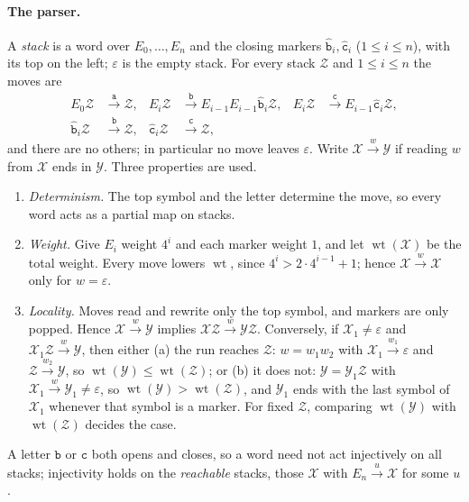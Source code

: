 \documentclass[11pt]{article}
\numberwithin{equation}{section}
\theoremstyle{plain}
\theoremstyle{definition}
\theoremstyle{remark}
\newcommand{\eps}{\varepsilon}
\theoremstyle{plain}
\begin{document}
\paragraph{The parser.}
A \emph{stack} is a word over $E_0,\ldots,E_n$ and the closing markers
$\hat{\mathtt b}_i,\hat{\mathtt c}_i$ ($1\le i\le n$), with its top on the left; $\eps$
is the empty stack.  For every stack $\mathcal Z$ and $1\le i\le n$ the moves are
\[
\begin{aligned}
E_0\mathcal Z&\xrightarrow{\mathtt a}\mathcal Z,&
E_i\mathcal Z&\xrightarrow{\mathtt b}E_{i-1}E_{i-1}\hat{\mathtt b}_i\mathcal Z,&
E_i\mathcal Z&\xrightarrow{\mathtt c}E_{i-1}\hat{\mathtt c}_i\mathcal Z,\\
\hat{\mathtt b}_i\mathcal Z&\xrightarrow{\mathtt b}\mathcal Z,&
\hat{\mathtt c}_i\mathcal Z&\xrightarrow{\mathtt c}\mathcal Z,
\end{aligned}
\]
and there are no others; in particular no move leaves $\eps$.  Write
$\mathcal X\xrightarrow{w}\mathcal Y$ if reading $w$ from $\mathcal X$ ends in
$\mathcal Y$.  Three properties are used.
\begin{enumerate}[label=\textup{(D\arabic*)},leftmargin=2.6em]
\item \emph{Determinism.} The top symbol and the letter determine the move, so
every word acts as a partial map on stacks.
\item \emph{Weight.} Give $E_i$ weight $4^i$ and each marker weight $1$, and let
$\operatorname{wt}(\mathcal X)$ be the total weight.  Every move lowers
$\operatorname{wt}$, since $4^i>2\cdot4^{i-1}+1$; hence
$\mathcal X\xrightarrow{w}\mathcal X$ only for $w=\eps$.
\item \emph{Locality.} Moves read and rewrite only the top symbol, and markers
are only popped.  Hence $\mathcal X\xrightarrow{w}\mathcal Y$ implies
$\mathcal X\mathcal Z\xrightarrow{w}\mathcal Y\mathcal Z$.  Conversely, if
$\mathcal X_1\ne\eps$ and $\mathcal X_1\mathcal Z\xrightarrow{w}\mathcal Y$, then either
\textup{(a)} the run reaches $\mathcal Z$: $w=w_1w_2$ with
$\mathcal X_1\xrightarrow{w_1}\eps$ and $\mathcal Z\xrightarrow{w_2}\mathcal Y$, so
$\operatorname{wt}(\mathcal Y)\le\operatorname{wt}(\mathcal Z)$; or \textup{(b)} it
does not: $\mathcal Y=\mathcal Y_1\mathcal Z$ with $\mathcal X_1\xrightarrow{w}\mathcal Y_1\ne\eps$,
so $\operatorname{wt}(\mathcal Y)>\operatorname{wt}(\mathcal Z)$, and $\mathcal Y_1$ ends
with the last symbol of $\mathcal X_1$ whenever that symbol is a marker.  For
fixed $\mathcal Z$, comparing $\operatorname{wt}(\mathcal Y)$ with
$\operatorname{wt}(\mathcal Z)$ decides the case.
\end{enumerate}
A letter $\mathtt b$ or $\mathtt c$ both opens and closes, so a word need not act
injectively on all stacks; injectivity holds on the \emph{reachable} stacks,
those $\mathcal X$ with $E_n\xrightarrow{u}\mathcal X$ for some $u$.
\end{document}
